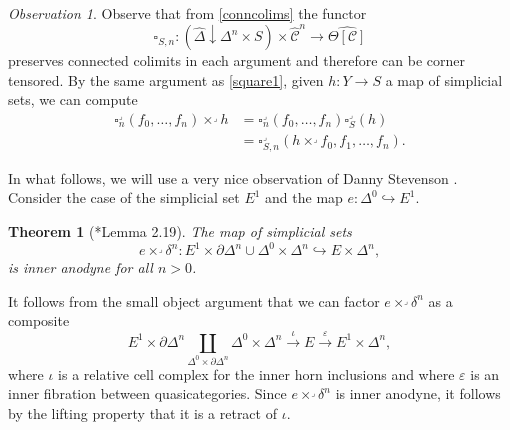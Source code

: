 \documentclass[leqno]{article}
\numberwithin{equation}{subsection}
\theoremstyle{plain}   %
\newtheorem{thm}[equation]{Theorem}
\theoremstyle{remark}
\newtheorem{obs}[equation]{Observation}
\theoremstyle{plain}
\newcommand{\overcat}[2]{{\left(#1\downarrow #2\right)}}
\newcommand{\psh}[1]{\ensuremath{\widehat{#1}}}
\renewcommand{\C}{\ensuremath{\mathcal{C}}}
\newcommand{\cellset}{\ensuremath{\widehat{\Theta[\mathcal{C}]}}}
\begin{document}
\begin{obs}\label{joyalsquare1}
	Observe that from \ref{conncolims} the functor 
	\[\square_{S,n}:\overcat{\psh{\Delta}}{\Delta^n\times S} \times\psh{\C}^n \to \cellset\]
	preserves connected colimits in each argument and therefore can be corner tensored. By the same argument as \ref{square1}, given \(h:Y\to S\) a map of simplicial sets, we can compute 
	\begin{align*}
		\square^\lrcorner_n(f_0,\dots,f_n) \times^\lrcorner h &= \square^\lrcorner_n(f_0,\dots,f_n) \square_S^\lrcorner(h)\\
		&= \square^\lrcorner_{S,n}(h\times^\lrcorner f_0,f_1,\dots,f_n).
	\end{align*}
\end{obs}

In what follows, we will use a very nice observation of Danny Stevenson \cite{danny}.  Consider the case of the simplicial set \(E^1\) and the map \(e:\Delta^0 \hookrightarrow E^1\).  
\begin{thm}[\cite{danny}*{Lemma 2.19}]\label{dannythm}
	The map of simplicial sets
	\[e\times^\lrcorner \delta^n: E^1\times \partial\Delta^n \cup \Delta^0 \times \Delta^n \hookrightarrow E\times \Delta^n,\]
	is inner anodyne for all \(n>0\).  
\end{thm}
It follows from the small object argument that we can factor \(e\times^\lrcorner \delta^n\) as a composite
\[
	E^1 \times \partial \Delta^n \coprod_{\Delta^0 \times \partial \Delta^n} \Delta^0 \times \Delta^n \xrightarrow{\iota} E \xrightarrow{\varepsilon} E^1 \times \Delta^n,
\] where \(\iota\) is a relative cell complex for the inner horn inclusions and where \(\varepsilon\) is an inner fibration between quasicategories. Since \(e\times^\lrcorner \delta^n\) is inner anodyne, it follows by the lifting property that it is a retract of \(\iota\).  
\end{document}
